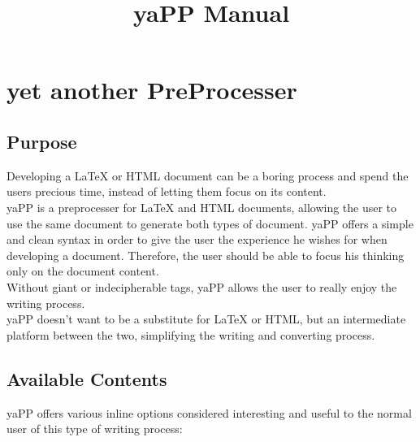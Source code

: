 \documentclass{article}
\begin{document}
\title{yaPP Manual}
\maketitle
\section{yet another PreProcesser}
\subsection{Purpose}
Developing a LaTeX or HTML document can be a boring process and spend the users precious time, instead of letting them focus on its content.\\
 yaPP is a preprocesser for LaTeX and HTML documents, allowing the user to use the same document to generate both types of document. yaPP offers a simple and clean syntax in order to give the user the experience he wishes for when developing a document. Therefore, the user should be able to focus his thinking only on the document content.\\
 Without giant or indecipherable tags, yaPP allows the user to really enjoy the writing process.\\
 yaPP doesn't want to be a substitute for LaTeX or HTML, but an intermediate platform between the two, simplifying the writing and converting process. \subsection{Available Contents}
yaPP offers various inline options considered interesting and useful to the normal user of this type of writing process: 
\end{document}
